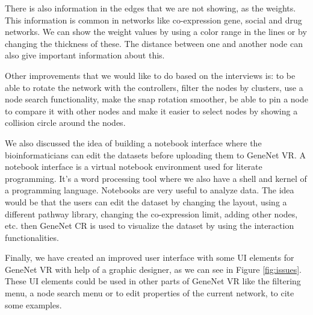 There is also information in the edges that we are not showing, as the weights. This information is common in networks like co-expression gene, social and drug networks. We can show the weight values by using a color range in the lines or by changing the thickness of these. The distance between one and another node can also give important information about this.

Other improvements that we would like to do based on the interviews is: to be able to rotate the network with the controllers, filter the nodes by clusters, use a node search functionality, make the snap rotation smoother, be able to pin a node to compare it with other nodes and make it easier to select nodes by showing a collision circle around the nodes.

We also discussed the idea of building a notebook interface where the bioinformaticians can edit the datasets before uploading them to GeneNet VR. A notebook interface is a virtual notebook environment used for literate programming. It's a word processing tool where we also have a shell and kernel of a programming language. Notebooks are very useful to analyze data. The idea would be that the users can edit the dataset by changing the layout, using a different pathway library, changing the co-expression limit, adding other nodes, etc. then GeneNet CR is used to visualize the dataset by using the interaction functionalities.

Finally, we have created an improved user interface with some UI elements for GeneNet VR with help of a graphic designer, as we can see in Figure \ref{fig:issues}. These UI elements could be used in other parts of GeneNet VR like the filtering menu, a node search menu or to edit properties of the current network, to cite some examples.
